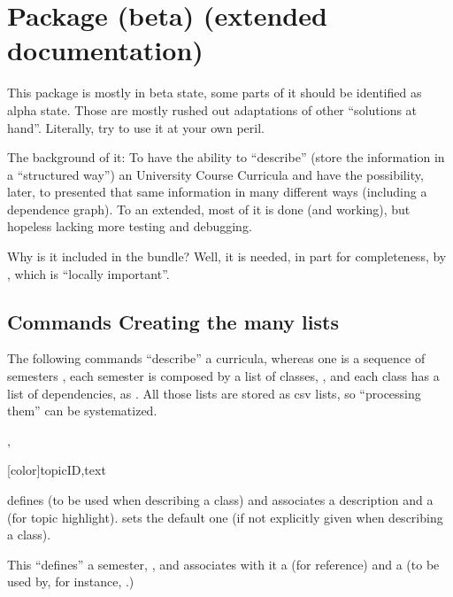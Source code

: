 \documentclass[article,nogeometry,english,tocdepth=3,secdepth=3]{ufrgscca} %
\begin{document}
\section{ Package (beta) (extended documentation)}
This package is mostly in beta state, some parts of it should be identified as  alpha state. Those are mostly rushed out adaptations of other “solutions at hand”. Literally, try to use it at your own peril.

The background of it: To have the ability to “describe” (store the information in a “structured way”) an University Course Curricula and  have the possibility, later, to presented that same information in many different ways (including a dependence graph). To an extended, most of it is done (and working), but hopeless lacking more testing and debugging.

Why is it included in the bundle? Well, it is needed, in part for completeness, by , which is “locally important”.

\subsection{Commands Creating the many lists}
The following commands “describe” a curricula, whereas one is a sequence of semesters , each semester is composed by a list of classes, , and each class has a list of dependencies,  as \tsmacro{\depdef}{}. All those lists are stored as csv lists, so “processing them” can be systematized.

\begin{codedescribe}{\topicdef,}
\begin{codesyntax}%
    \tsmacro{\topicdef}[color]{topicID,text}
\end{codesyntax}
\tsmacro{\topicdef}{} defines  (to be used when describing a class) and associates a  description and a  (for topic highlight).  sets the default one (if not explicitly given when describing a class).
\end{codedescribe}


\begin{codedescribe}{\semdef}
    \begin{codesyntax}%
    \end{codesyntax}
This “defines” a semester, , and associates with it a  (for reference) and a  (to be used by, for instance, .)
\end{codedescribe}
\end{document}
